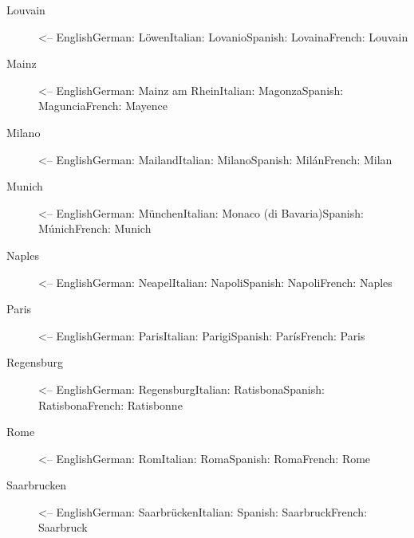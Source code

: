 \documentclass[a4paper,
10pt,
greek,
french,
spanish,
italian,
ngerman,
english
]{ltxdoc}
\begin{document}
\begin{multicols}{3}
\begin{description}
\item[Louvain] <-- English\newline German: Löwen\newline Italian: Lovanio\newline Spanish: Lovaina\newline French: Louvain
\item[Mainz] <-- English\newline German: Mainz am Rhein\newline Italian: Magonza\newline Spanish: Maguncia\newline French: Mayence
\item[Milano] <-- English\newline German: Mailand\newline Italian: Milano\newline Spanish: Milán\newline French: Milan
\item[Munich] <-- English\newline German: München\newline Italian: Monaco (di Bavaria)\newline Spanish: Múnich\newline French: Munich
\item[Naples] <-- English\newline German: Neapel\newline Italian: Napoli\newline Spanish: Napoli\newline French: Naples
\item[Paris] <-- English\newline German: Paris\newline Italian: Parigi\newline Spanish: París\newline French: Paris
\item[Regensburg] <-- English\newline German: Regensburg\newline Italian: Ratisbona\newline Spanish: Ratisbona\newline French: Ratisbonne
\item[Rome] <-- English\newline German: Rom\newline Italian: Roma\newline Spanish: Roma\newline French: Rome
\item[Saarbrucken] <-- English\newline German: Saarbrücken\newline Italian: \newline Spanish: Saarbruck\newline French: Saarbruck

\end{description}
\end{multicols}
\end{document}
